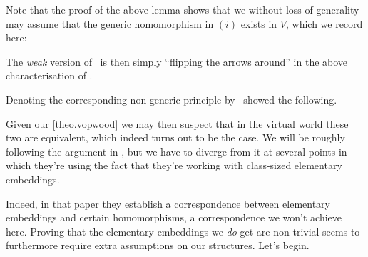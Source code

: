 \documentclass[../main]{subfiles}
\begin{document}
  Note that the proof of the above lemma shows that we without loss of generality may assume that the generic homomorphism in $(i)$ exists in $V$, which we record here:


The \textit{weak} version of \gvp\ is then simply ``flipping the arrows around'' in the above characterisation of \gvp.


Denoting the corresponding non-generic principle by \wvp\, \cite{WilsonWVP} showed the following.


Given our \ref{theo.vopwood} we may then suspect that in the virtual world these two are equivalent, which indeed turns out to be the case. We will be roughly following the argument in \cite{WilsonWVP}, but we have to diverge from it at several points in which they're using the fact that they're working with class-sized elementary embeddings. 

\qquad Indeed, in that paper they establish a correspondence between elementary embeddings and certain homomorphisms, a correspondence we won't achieve here. Proving that the elementary embeddings we \textit{do} get are non-trivial seems to furthermore require extra assumptions on our structures. Let's begin.
\end{document}
